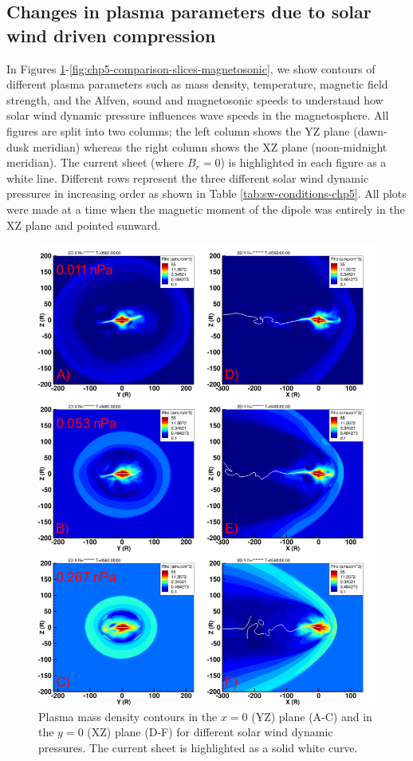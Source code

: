 \subsection{Changes in plasma parameters due to solar wind driven compression}

In Figures \ref{fig:chp5-comparison-slices-density}-\ref{fig:chp5-comparison-slices-magnetosonic}, we show contours of different plasma parameters such as mass density, temperature, magnetic field strength, and the Alfven, sound and magnetosonic speeds to understand how solar wind dynamic pressure influences wave speeds in the magnetosphere. All figures are split into two columns; the left column shows the YZ plane (dawn-dusk meridian) whereas the right column shows the XZ plane (noon-midnight meridian). The current sheet (where $B_r=0$) is highlighted in each figure as a white line. Different rows represent the three different solar wind dynamic pressures in increasing order as shown in Table \ref{tab:sw-conditions-chp5}. All plots were made at a time when the magnetic moment of the dipole was entirely in the XZ plane and pointed sunward. 

\begin{figure}
    \centering
    \includegraphics[height=0.9\textheight]{images5/compare_runs_currentsheet_Density.png}
    \caption{Plasma mass density contours in the $x=0$ (YZ) plane (A-C) and in the $y=0$ (XZ) plane (D-F) for different solar wind dynamic pressures. The current sheet is highlighted as a solid white curve.}
    \label{fig:chp5-comparison-slices-density}
\end{figure}

